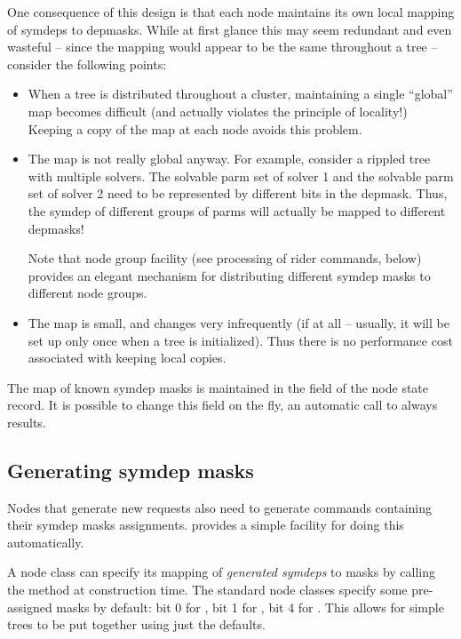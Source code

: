   One consequence of this design is that each node maintains its own local
  mapping of symdeps to depmasks. While at first glance this may seem redundant
  and even wasteful -- since the mapping would appear to be the same throughout
  a tree -- consider the following points:

  \begin{itemize}
  
  \item When a tree is distributed throughout a cluster, maintaining a single
    ``global'' map becomes difficult (and actually violates the principle of
    locality!) Keeping a copy of the map at each node avoids this problem.

  \item The map is not really global anyway. For example, consider a rippled
    tree with multiple solvers. The solvable parm set of solver 1 and the
    solvable parm set of solver 2 need to be represented by different bits in
    the depmask. Thus, the  symdep of different groups of
    parms will actually be mapped to different depmasks!
    
    Note that node group facility (see processing of rider commands, below)
    provides an elegant mechanism for distributing different symdep masks to
    different node groups.
    
  \item The map is small, and changes very infrequently (if at all -- usually,
    it will be set up only once when a tree is initialized). Thus there is no
    performance cost associated with keeping local copies.

  \end{itemize}
  
  The map of known symdep masks is maintained in the  field of
  the node state record. It is possible to change this field on the fly, an
  automatic call to  always results.

\subsection{Generating symdep masks}

  Nodes that generate new requests also need to generate 
  commands containing their symdep masks assignments.  provides a
  simple facility for doing this automatically.
  
  A node class can specify its mapping of {\em generated symdeps} to masks
  by calling the  method at construction time. The standard
  node classes specify some pre-assigned masks by default: bit 0 for
  , bit 1 for , bit 4 for . This
  allows for simple trees to be put together using just the defaults.
  
